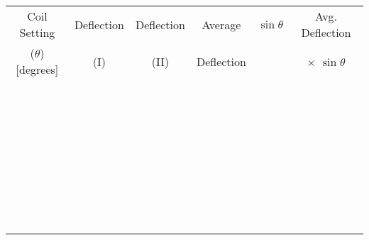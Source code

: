 \vspace{0.3cm}
\begin{center} 
\begin{tabular}{|c|c|c|c|c|c|}
\hline 
Coil Setting&
Deflection&
Deflection&
Average &
\( \sin \theta  \)&
Avg. Deflection\\
(\( \theta  \)) {[}degrees{]}&
(I)&
(II)&
Deflection&
&
\( \times  \) \( \sin \theta  \)\\
\hline 
&
&
&
&
&
\\
\hline 
&
&
&
&
&
\\
\hline 
&
&
&
&
&
\\
\hline 
&
&
&
&
&
\\
\hline 
&
&
&
&
&
\\
\hline 
&
&
&
&
&
\\
\hline 
&
&
&
&
&
\\
\hline 
&
&
&
&
&
\\
\hline 
&
&
&
&
&
\\
\hline 
&
&
&
&
&
\\
\hline 
&
&
&
&
&
\\
\hline 
&
&
&
&
&
\\
\hline 
&
&
&
&
&
\\
\hline 
&
&
&
&
&
\\
\hline 
&
&
&
&
&
\\
\hline 
&
&
&
&
&
\\
\hline 
&
&
&
&
&
\\
\hline 
&
&
&
&
&
\\
\hline 
&
&
&
&
&
\\
\hline 
&
&
&
&
&
\\
\hline 
&
&
&
&
&
\\
\hline 
&
&
&
&
&
\\
\hline 
&
&
&
&
&
\\
\hline 
&
&
&
&
&
\\
\hline 
&
&
&
&
&
\\
\hline 
&
&
&
&
&
\\
\hline 
&
&
&
&
&
\\
\hline 
&
&
&
&
&
\\
\hline 
&
&
&
&
&
\\
\hline 
&
&
&
&
&
\\
\hline 
&
&
&
&
&
\\
\hline 
&
&
&
&
&
\\
\hline 
&
&
&
&
&
\\
\hline 
&
&
&
&
&
\\
\hline 
&
&
&
&
&
\\
\hline 
&
&
&
&
&
\\
\hline
\end{tabular}\vspace{0.3cm}

\end{center}

